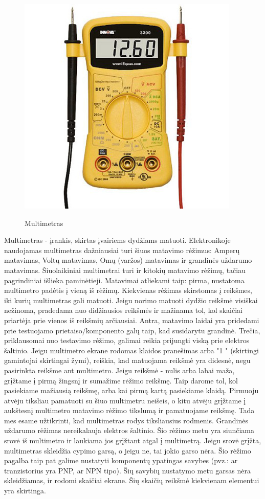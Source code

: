 \documentclass{VUMIFPSkursinis}
\begin{document}
\begin{figure}[h]
	\caption{Multimetras}
	\centering
	\includegraphics{img/multimeter}\cite{10}\\
\end{figure}

Multimetras - įrankis, skirtas įvairiems dydžiams matuoti. Elektronikoje naudojamas multimetras dažniausiai turi šiuos matavimo rėžimus: Amperų matavimas, Voltų matavimas, Omų (varžos) matavimas ir grandinės uždarumo matavimas. Šiuolaikiniai multimetrai turi ir kitokių matavimo rėžimų, tačiau pagrindiniai išlieka paminėtieji. Matavimai atliekami taip: pirma, nustatoma multimetro padėtis į vieną iš rėžimų. Kiekvienas rėžimas skirstomas į reikšmes, iki kurių multimetras gali matuoti. Jeigu norimo matuoti dydžio reikšmė visiškai nežinoma, pradedama nuo didžiausios reikšmės ir mažinama tol, kol skaičiai priartėja prie vienos iš reikšmių arčiausiai. Antra, matavimo laidai yra pridedami prie testuojamo prietaiso/komponento galų taip, kad susidarytu grandinė. Trečia, priklausomai nuo testavimo rėžimo, galimai reikia prijungti viską prie elektros šaltinio. Jeigu multimetro ekrane rodomas klaidos pranešimas arba "1    " (skirtingi gamintojai skirtingai žymi), reiškia, kad matuojama reikšmė yra didesnė, negu pasirinkta reikšme ant multimetro. Jeigu reikšmė - nulis arba labai maža, grįžtame į pirmą žingsnį ir sumažime rėžimo reikšmę. Taip darome tol, kol pasiekiame mažiausią reikšmę, arba kai pirmą kartą pasiekiame klaidą. Pirmuoju atvėju tiksliau pamatuoti su šiuo multimetru neišeis, o kitu atvėju grįžtame į aukštesnį multimetro matavimo rėžimo tikslumą ir pamatuojame reikšmę. Tada mes esame užtikrinti, kad multimetras rodys tiksliausius rodmenis. Grandinės uždarumo rėžimas nereikalauja elektros šaltinio. Šio rėžimo metu yra siunčiama srovė iš multimetro ir laukiama jos grįžtant atgal į multimetrą. Jeigu srovė grįžta, multimetras skleidžia cypimo garsą, o jeigu ne, tai jokio garso nėra. Šio rėžimo pagalba taip pat galime nustatyti komponentų ypatingas savybes (pvz.: ar tranzistorius yra PNP, ar NPN tipo). Šių savybių nustatymo metu garsas nėra skleidžiamas, ir rodomi skaičiai ekrane. Šių skaičių reikšmė kiekvienam elementui yra skirtinga.
\end{document}
